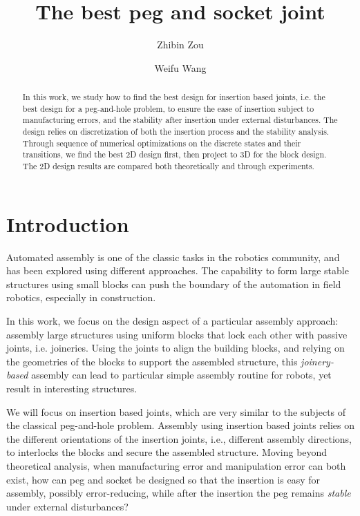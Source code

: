 \documentclass[11pt, twocolumn]{article}
\title{The best peg and socket joint}
\author{Zhibin Zou \and Weifu Wang}
\date{}
\begin{document}
\maketitle

\begin{abstract}
In this work, we study how to find the best design for insertion based joints, i.e. the best design for a peg-and-hole problem, to ensure the ease of insertion subject to manufacturing errors, and the stability after insertion under external disturbances. The design relies on discretization of both the insertion process and the stability analysis. Through sequence of numerical optimizations on the discrete states and their transitions, we find the best 2D design first, then project to 3D for the block design. The 2D design results are compared both theoretically and through experiments. 
\end{abstract}

\section{Introduction}

Automated assembly is one of the classic tasks in the robotics community, and has been explored using different approaches. The capability to form large stable structures using small blocks can push the boundary of the automation in field robotics, especially in construction. %

In this work, we focus on the design aspect of a particular assembly approach: assembly large structures using uniform blocks that lock each other with passive joints, i.e. joineries. Using the joints to align the building blocks, and relying on the geometries of the blocks to support the assembled structure, this {\em joinery-based} assembly can lead to particular simple assembly routine for robots, yet result in interesting structures. 


We will focus on insertion based joints, which are very similar to the subjects of the classical peg-and-hole problem. Assembly using insertion based joints relies on the different orientations of the insertion joints, i.e., different assembly directions, to interlocks the blocks and secure the assembled structure. Moving beyond theoretical analysis, when manufacturing error and manipulation error can both exist, how can peg and socket be designed so that the insertion is easy for assembly, possibly error-reducing, while after the insertion the peg remains {\em stable} under external disturbances?
\end{document}
